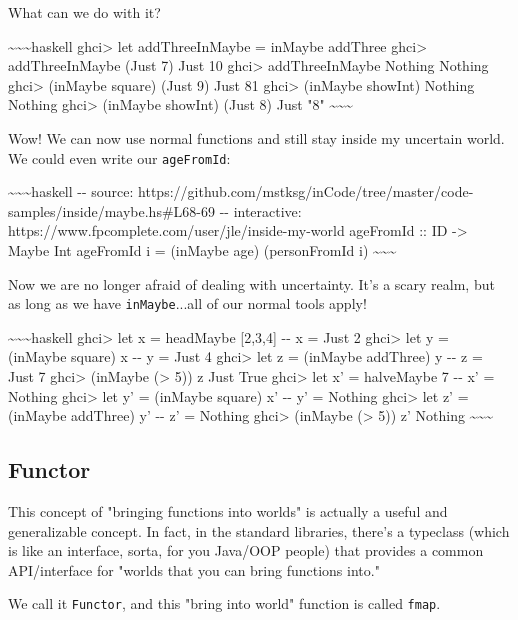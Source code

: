 \documentclass[]{article}
\begin{document}
What can we do with it?

\textasciitilde{}\textasciitilde{}\textasciitilde{}haskell ghci\textgreater{}
let addThreeInMaybe = inMaybe addThree ghci\textgreater{} addThreeInMaybe (Just
7) Just 10 ghci\textgreater{} addThreeInMaybe Nothing Nothing ghci\textgreater{}
(inMaybe square) (Just 9) Just 81 ghci\textgreater{} (inMaybe showInt) Nothing
Nothing ghci\textgreater{} (inMaybe showInt) (Just 8) Just "8"
\textasciitilde{}\textasciitilde{}\textasciitilde{}

Wow! We can now use normal functions and still stay inside my uncertain world.
We could even write our \texttt{ageFromId}:

\textasciitilde{}\textasciitilde{}\textasciitilde{}haskell -\/- source:
https://github.com/mstksg/inCode/tree/master/code-samples/inside/maybe.hs\#L68-69
-\/- interactive: https://www.fpcomplete.com/user/jle/inside-my-world ageFromId
:: ID -\textgreater{} Maybe Int ageFromId i = (inMaybe age) (personFromId i)
\textasciitilde{}\textasciitilde{}\textasciitilde{}

Now we are no longer afraid of dealing with uncertainty. It's a scary realm, but
as long as we have \texttt{inMaybe}...all of our normal tools apply!

\textasciitilde{}\textasciitilde{}\textasciitilde{}haskell ghci\textgreater{}
let x = headMaybe {[}2,3,4{]} -\/- x = Just 2 ghci\textgreater{} let y =
(inMaybe square) x -\/- y = Just 4 ghci\textgreater{} let z = (inMaybe addThree)
y -\/- z = Just 7 ghci\textgreater{} (inMaybe (\textgreater{} 5)) z Just True
ghci\textgreater{} let x' = halveMaybe 7 -\/- x' = Nothing ghci\textgreater{}
let y' = (inMaybe square) x' -\/- y' = Nothing ghci\textgreater{} let z' =
(inMaybe addThree) y' -\/- z' = Nothing ghci\textgreater{} (inMaybe
(\textgreater{} 5)) z' Nothing
\textasciitilde{}\textasciitilde{}\textasciitilde{}

\subsection{Functor}

This concept of "bringing functions into worlds" is actually a useful and
generalizable concept. In fact, in the standard libraries, there's a typeclass
(which is like an interface, sorta, for you Java/OOP people) that provides a
common API/interface for "worlds that you can bring functions into."

We call it \texttt{Functor}, and this "bring into world" function is called
\texttt{fmap}.
\end{document}
